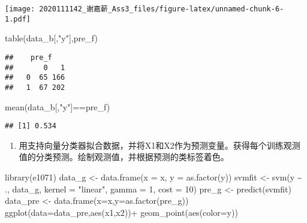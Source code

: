 \documentclass[
]{article}
\newenvironment{Shaded}{\begin{snugshade}}{\end{snugshade}}
\newcommand{\AttributeTok}[1]{\textcolor[rgb]{0.77,0.63,0.00}{#1}}
\newcommand{\DecValTok}[1]{\textcolor[rgb]{0.00,0.00,0.81}{#1}}
\newcommand{\FunctionTok}[1]{\textcolor[rgb]{0.00,0.00,0.00}{#1}}
\newcommand{\NormalTok}[1]{#1}
\newcommand{\OtherTok}[1]{\textcolor[rgb]{0.56,0.35,0.01}{#1}}
\newcommand{\SpecialCharTok}[1]{\textcolor[rgb]{0.00,0.00,0.00}{#1}}
\newcommand{\StringTok}[1]{\textcolor[rgb]{0.31,0.60,0.02}{#1}}
\providecommand{\tightlist}{%
  \setlength{\itemsep}{0pt}\setlength{\parskip}{0pt}}
\begin{document}
\texttt{[image: 2020111142\_谢嘉薪\_Ass3\_files/figure-latex/unnamed-chunk-6-1.pdf]}

\begin{Shaded}
\begin{Highlighting}[]
\FunctionTok{table}\NormalTok{(data\_b[,}\StringTok{"y"}\NormalTok{],pre\_f)}
\end{Highlighting}
\end{Shaded}

\begin{verbatim}
##    pre_f
##       0   1
##   0  65 166
##   1  67 202
\end{verbatim}

\begin{Shaded}
\begin{Highlighting}[]
\FunctionTok{mean}\NormalTok{(data\_b[,}\StringTok{"y"}\NormalTok{]}\SpecialCharTok{==}\NormalTok{pre\_f)}
\end{Highlighting}
\end{Shaded}

\begin{verbatim}
## [1] 0.534
\end{verbatim}

\begin{enumerate}
\def\labelenumi{(\alph{enumi})}
\setcounter{enumi}{6}
\tightlist
\item
  用支持向量分类器拟合数据，并将X1和X2作为预测变量。获得每个训练观测值的分类预测。绘制观测值，并根据预测的类标签着色。
\end{enumerate}

\begin{Shaded}
\begin{Highlighting}[]
\FunctionTok{library}\NormalTok{(e1071)}
\NormalTok{data\_g }\OtherTok{\textless{}{-}} \FunctionTok{data.frame}\NormalTok{(}\AttributeTok{x =}\NormalTok{ x, }\AttributeTok{y =} \FunctionTok{as.factor}\NormalTok{(y))}
\NormalTok{svmfit }\OtherTok{\textless{}{-}} \FunctionTok{svm}\NormalTok{(y }\SpecialCharTok{\textasciitilde{}}\NormalTok{ ., data\_g, }\AttributeTok{kernel =} \StringTok{"linear"}\NormalTok{, }\AttributeTok{gamma =} \DecValTok{1}\NormalTok{, }\AttributeTok{cost =} \DecValTok{10}\NormalTok{)}
\NormalTok{pre\_g }\OtherTok{\textless{}{-}} \FunctionTok{predict}\NormalTok{(svmfit)}
\NormalTok{data\_pre }\OtherTok{\textless{}{-}} \FunctionTok{data.frame}\NormalTok{(}\AttributeTok{x=}\NormalTok{x,}\AttributeTok{y=}\FunctionTok{as.factor}\NormalTok{(pre\_g))}
\FunctionTok{ggplot}\NormalTok{(}\AttributeTok{data=}\NormalTok{data\_pre,}\FunctionTok{aes}\NormalTok{(x1,x2))}\SpecialCharTok{+}
  \FunctionTok{geom\_point}\NormalTok{(}\FunctionTok{aes}\NormalTok{(}\AttributeTok{color=}\NormalTok{y))}
\end{Highlighting}
\end{Shaded}
\end{document}
